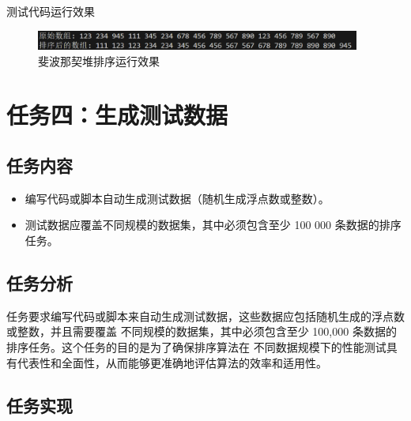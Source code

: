 \documentclass[UTF8]{ctexart}
\begin{document}
测试代码运行效果
\begin{figure}[H]
    \centering
    \includegraphics[width=0.95\textwidth]{picture/Screenshot 2024-10-20 162121.png}
    \caption{斐波那契堆排序运行效果}
\end{figure}


\section{任务四：生成测试数据}
\subsection{任务内容}
\begin{itemize}
    \item 编写代码或脚本自动生成测试数据（随机生成浮点数或整数）。
    \item 测试数据应覆盖不同规模的数据集，其中必须包含至少 100 000 条数据的排序任务。
\end{itemize}

\subsection{任务分析}
任务要求编写代码或脚本来自动生成测试数据，这些数据应包括随机生成的浮点数或整数，并且需要覆盖
不同规模的数据集，其中必须包含至少 100,000 条数据的排序任务。这个任务的目的是为了确保排序算法在
不同数据规模下的性能测试具有代表性和全面性，从而能够更准确地评估算法的效率和适用性。

\subsection{任务实现}
\end{document}
